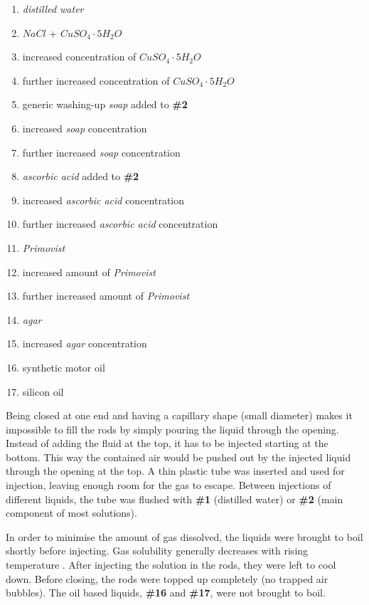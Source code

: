 \newpage
\begin{enumerate}[label=\textbf{\#\arabic*}]
 \item \textit{distilled water}
 \item $NaCl$ + $CuSO_4\cdot5H_2O$
 \item increased concentration of $CuSO_4\cdot5H_2O$
 \item further increased concentration of $CuSO_4\cdot5H_2O$
 \item generic washing-up \textit{soap} added to \textbf{\#2}
 \item increased \textit{soap} concentration
 \item further increased \textit{soap} concentration
 \item \textit{ascorbic acid} added to \textbf{\#2}
 \item increased \textit{ascorbic acid} concentration
 \item further increased \textit{ascorbic acid} concentration
 \item \textit{Primovist}
 \item increased amount of \textit{Primovist}
 \item further increased amount of \textit{Primovist}
 \item \textit{agar}
 \item increased \textit{agar} concentration
 \item synthetic motor oil
 \item silicon oil
\end{enumerate}

Being closed at one end and having a capillary shape (small diameter) makes it impossible to fill the rods by simply pouring the liquid through the opening.
Instead of adding the fluid at the top, it has to be injected starting at the bottom.
This way the contained air would be pushed out by the injected liquid through the opening at the top.
A thin plastic tube was inserted and used for injection, leaving enough room for the gas to escape.
Between injections of different liquids, the tube was flushed with \textbf{\#1} (distilled water) or \textbf{\#2} (main component of most solutions).

In order to minimise the amount of gas dissolved, the liquids were brought to boil shortly before injecting. Gas solubility generally decreases with rising temperature \cite{Henry1803, Sander2015}.
After injecting the solution in the rods, they were left to cool down.
Before closing, the rods were topped up completely (no trapped air bubbles).
The oil based liquids, \textbf{\#16} and \textbf{\#17}, were not brought to boil.


